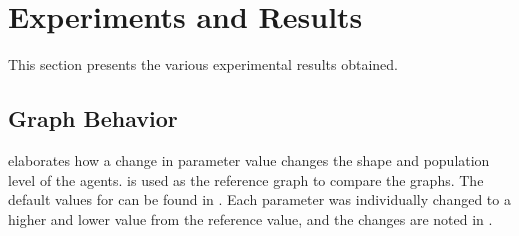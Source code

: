 \chapter{Experiments and Results}
\label{AER}
This section presents the various experimental results obtained. 

\section{Graph Behavior}
 elaborates how a change in parameter value changes the shape and population level of the agents. 
 is used as the reference graph to compare the graphs. 
The default values for  can be found in .  
Each parameter was individually changed to a higher and lower value from the reference value, and the changes are noted in . 

